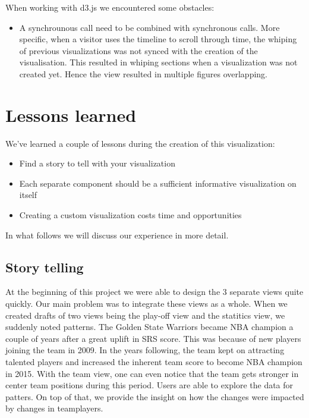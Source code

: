 \documentclass[chi_draft]{sigchi}
\begin{document}
When working with d3.js we encountered some obstacles:
\begin{itemize}
        \item A synchrounous call need to be combined with synchronous calls.
            More specific, when a visitor uses the timeline to scroll through
            time, the whiping of previous visualizations was not synced with the
            creation of the visualisation. This resulted in whiping sections
            when a visualization was not created yet. Hence the view resulted in
            multiple figures overlapping.
\end{itemize}


\section{Lessons learned}\label{sec:discussion}
We've learned a couple of lessons during the creation of this visualization:
\begin{itemize}
    \item Find a story to tell with your visualization
    \item Each separate component should be a sufficient informative visualization on itself
    \item Creating a custom visualization costs time and opportunities
\end{itemize}
In what follows we will discuss our experience in more detail.

\subsection{Story telling}
At the beginning of this project we were able to design the 3 separate views
quite quickly. Our main problem was to integrate these views as a whole. When we
created drafts of two views being the play-off view and the statitics view, we
suddenly noted patterns. The Golden State Warriors became NBA champion a couple
of years after a great uplift in SRS score. This was because of new players
joining the team in 2009. In the years following, the team kept on attracting
talented players and increased the inherent team score to become NBA champion in
2015. With the team view, one can even notice that the team gets stronger in
center team positions during this period. Users are able to explore the data for
patters. On top of that, we provide the insight on how the changes were impacted
by changes in teamplayers.
\end{document}
